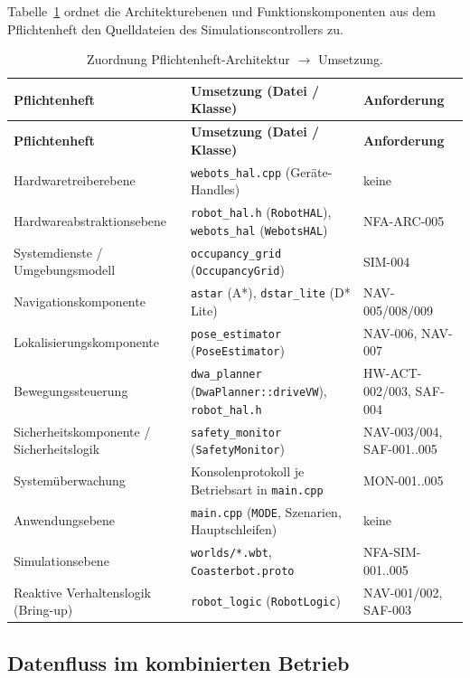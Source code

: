 \documentclass[
  a4paper,
  12pt,
  DIV=12,        %
  parskip=half,  %
  headings=small %
]{scrartcl}
\theoremstyle{definition}
\theoremstyle{definition}
\begin{document}
Tabelle~\ref{tab:mapping-arch} ordnet die
Architekturebenen und Funktionskomponenten aus dem Pflichtenheft den
Quelldateien des Simulationscontrollers zu.

\begin{longtable}[]{@{}
  >{\raggedright\arraybackslash}p{}
  >{\raggedright\arraybackslash}p{}
  >{\raggedright\arraybackslash}p{}@{}}
\caption{Zuordnung Pflichtenheft-Architektur $\rightarrow$ Umsetzung.}
\label{tab:mapping-arch}\\
\toprule
\textbf{Pflichtenheft} & \textbf{Umsetzung (Datei / Klasse)} & \textbf{Anforderung}\\
\midrule
\endfirsthead
\toprule
\textbf{Pflichtenheft} & \textbf{Umsetzung (Datei / Klasse)} & \textbf{Anforderung}\\
\midrule
\endhead
\bottomrule
\endfoot
Hardware\-treiber\-ebene & \texttt{webots\_hal.cpp} (Geräte-Handles) & keine\\
Hardware\-abstraktions\-ebene & \texttt{robot\_hal.h} (\texttt{RobotHAL}), \texttt{webots\_hal} (\texttt{WebotsHAL}) & NFA-ARC-005\\
Systemdienste / Umgebungs\-modell & \texttt{occupancy\_grid} (\texttt{OccupancyGrid}) & SIM-004\\
Navigations\-komponente & \texttt{astar} (A*), \texttt{dstar\_lite} (D* Lite) & NAV-005/008/009\\
Lokalisierungs\-komponente & \texttt{pose\_estimator} (\texttt{PoseEstimator}) & NAV-006, NAV-007\\
Bewegungs\-steuerung & \texttt{dwa\_planner} (\texttt{DwaPlanner::driveVW}), \texttt{robot\_hal.h} & HW-ACT-002/003, SAF-004\\
Sicherheits\-komponente / Sicherheits\-logik & \texttt{safety\_monitor} (\texttt{SafetyMonitor}) & NAV-003/004, SAF-001..005\\
Systemüberwachung & Konsolenprotokoll je Betriebsart in \texttt{main.cpp} & MON-001..005\\
Anwendungsebene & \texttt{main.cpp} (\texttt{MODE}, Szenarien, Hauptschleifen) & keine\\
Simulationsebene & \texttt{worlds/*.wbt}, \texttt{Coasterbot.proto} & NFA-SIM-001..005\\
Reaktive Verhaltenslogik (Bring-up) & \texttt{robot\_logic} (\texttt{RobotLogic}) & NAV-001/002, SAF-003\\
\end{longtable}

\subsection{Datenfluss im kombinierten Betrieb}\label{datenfluss}
\end{document}

